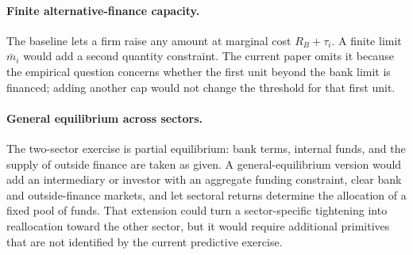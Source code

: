 \documentclass[11pt]{article}
\theoremstyle{definition}
\theoremstyle{remark}
\newcommand{\Rb}{R_B}
\begin{document}
\paragraph{Finite alternative-finance capacity.}
The baseline lets a firm raise any amount at marginal cost $\Rb+\tau_i$. A
finite limit $\bar m_i$ would add a second quantity constraint. The current
paper omits it because the empirical question concerns whether the first unit
beyond the bank limit is financed; adding another cap would not change the
threshold for that first unit.

\paragraph{General equilibrium across sectors.}
The two-sector exercise is partial equilibrium: bank terms, internal funds,
and the supply of outside finance are taken as given. A general-equilibrium
version would add an intermediary or investor with an aggregate funding
constraint, clear bank and outside-finance markets, and let sectoral returns
determine the allocation of a fixed pool of funds. That extension could turn a
sector-specific tightening into reallocation toward the other sector, but it
would require additional primitives that are not identified by the current
predictive exercise.
\end{document}
